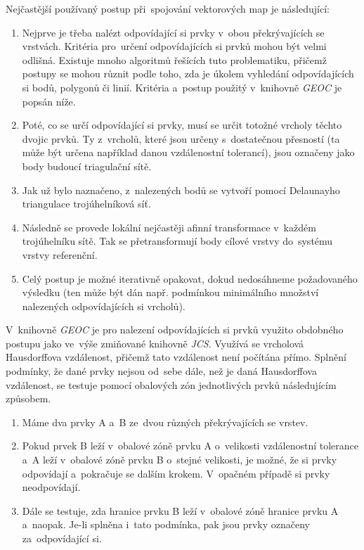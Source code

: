 Nejčastější používaný postup při~spojování vektorových map je následující:

\begin{enumerate}[leftmargin=*]
 \item Nejprve je třeba nalézt odpovídající si prvky v~obou překrývajících se vrstvách. Kritéria pro~určení odpovídajících si prvků mohou být velmi odlišná. Existuje mnoho
	algoritmů řešících tuto problematiku, přičemž postupy se mohou různit podle toho, zda je úkolem vyhledání odpovídajících si bodů, polygonů či linií. Kritéria a~postup
	použitý v~knihovně \textit{GEOC} je popsán níže.
 \item Poté, co se určí odpovídající si prvky, musí se určit totožné vrcholy těchto dvojic prvků. Ty z~vrcholů, které jsou určeny s~dostatečnou přesností (ta může být určena
	například danou vzdálenostní tolerancí), jsou označeny jako body budoucí triagulační sítě.
 \item Jak už bylo naznačeno, z~nalezených bodů se vytvoří pomocí Delaunayho triangulace trojúhelníková síť.
 \item Následně se provede lokální nejčastěji afinní transformace v~každém trojúhelníku sítě. Tak se přetransformují body cílové vrstvy do~systému vrstvy referenční.
 \item Celý postup je možné iterativně opakovat, dokud nedosáhneme požadovaného výsledku (ten může být dán např. podmínkou minimálního množství nalezených 
	odpovídajících si vrcholů).
\end{enumerate}

V~knihovně \textit{GEOC} je pro nalezení odpovídajících si prvků využito obdobného postupu jako ve~výše zmiňované knihovně \textit{JCS}. Využívá se vrcholová Hausdorffova 
vzdálenost, přičemž tato vzdálenost není počítána přímo. Splnění podmínky, že dané prvky nejsou od~sebe dále, než je daná Hausdorffova vzdálenost, se testuje pomocí obalových
zón jednotlivých prvků následujícím způsobem.

\begin{enumerate}[leftmargin=*]
 \item Máme dva prvky A a~B ze~dvou různých překrývajících se vrstev.
 \item Pokud prvek B leží v~obalové zóně prvku A o~velikosti vzdálenostní tolerance a~A leží v~obalové zóně prvku B o~stejné velikosti, je možné, že si prvky odpovídají 
	a~pokračuje se dalším krokem. V~opačném případě si prvky neodpovídají.
 \item Dále se testuje, zda hranice prvku B leží v~obalové zóně hranice prvku A a~naopak. Je-li splněna i~tato podmínka, pak jsou prvky označeny za~odpovídající si.
\end{enumerate}



